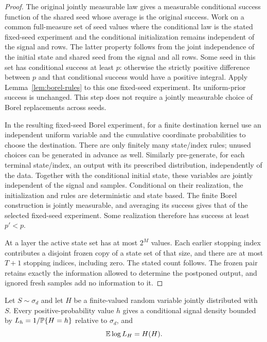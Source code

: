 \begin{proof}
The original jointly measurable law gives a measurable conditional success
function of the shared seed whose average is the original success. Work on
a common full-measure set of seed values where the conditional law is the
stated fixed-seed experiment and the conditional initialization remains
independent of the signal and rows. The latter property follows from the
joint independence of the initial state and shared seed from the signal and
all rows. Some seed in this set has conditional success at least $p$:
otherwise the strictly positive difference between $p$ and that conditional
success would have a positive integral. Apply
Lemma~\ref{lem:borel-rules} to this one fixed-seed experiment. Its
uniform-prior success is unchanged. This step does not require a jointly
measurable choice of Borel replacements across seeds.

In the resulting fixed-seed Borel experiment, for a finite destination
kernel use an independent uniform variable and
the cumulative coordinate probabilities to choose the destination. There
are only finitely many state/index rules; unused choices can be generated
in advance as well. Similarly pre-generate, for each terminal state/index,
an output with its prescribed distribution, independently of the data.
Together with the conditional initial state, these variables are jointly
independent of the signal and samples. Conditional on their realization,
the initialization and rules are deterministic and state based. The finite
Borel construction is jointly measurable, and averaging its success gives
that of the selected fixed-seed experiment. Some realization therefore has
success at least $p'<p$.

At a layer the active state set has at most $2^M$ values. Each earlier
stopping index contributes a disjoint frozen copy of a state set of that
size, and there are at most $T+1$ stopping indices, including zero. The
stated count follows. The frozen pair retains exactly the information
allowed to determine the postponed output, and ignored fresh samples add
no information to it.
\end{proof}

\begin{lemma}\label{lem:conditional-priors}
Let $S\sim\sigma_d$ and let $H$ be a finite-valued random variable jointly
distributed with $S$. Every positive-probability value $h$ gives a
conditional signal density bounded by
$L_h=1/\mathbb P\{H=h\}$ relative to $\sigma_d$, and
\begin{equation}\label{eq:rare-event-entropy}
 \mathbb E\log L_H=H(H).
\end{equation}
\end{lemma}

